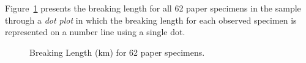 \documentclass[
  letterpaper,
  DIV=11,
  numbers=noendperiod]{scrreprt}
\theoremstyle{definition}
\theoremstyle{definition}
\theoremstyle{plain}
\theoremstyle{remark}
\begin{document}
\begin{table}

\caption{\label{tbl-summaries-paper-table}Breaking length (km) for first
5 specimens in the Paper Strength study.}


\end{table}%

Figure~\ref{fig-summaries-paper-dotplot} presents the breaking length
for all 62 paper specimens in the sample through a \emph{dot plot} in
which the breaking length for each observed specimen is represented on a
number line using a single dot.

\begin{figure}


\caption{\label{fig-summaries-paper-dotplot}Breaking Length (km) for 62
paper specimens.}

\end{figure}%
\end{document}
